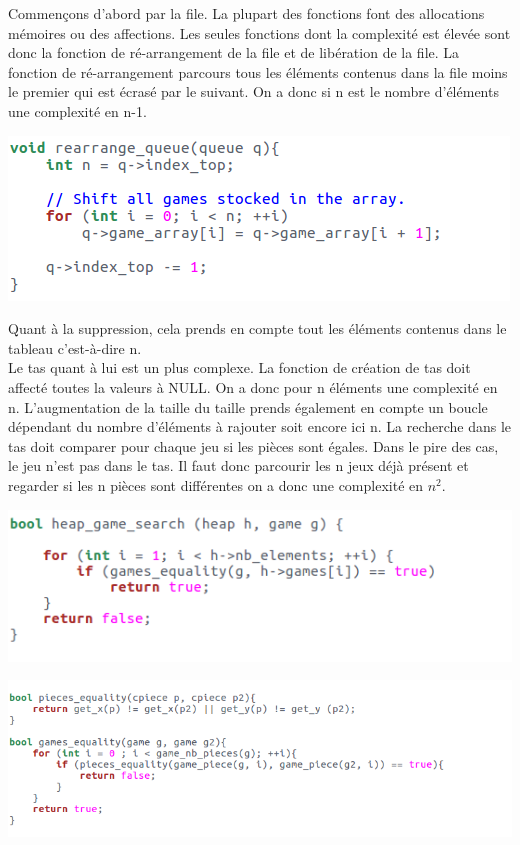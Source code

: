 \documentclass{article}
\begin{document}
Commençons d'abord par la file. La plupart des fonctions font des allocations mémoires ou des affections. Les seules fonctions dont la complexité est élevée sont donc la fonction de ré-arrangement de la file et de libération de la file. La fonction de ré-arrangement parcours tous les éléments contenus dans la file moins le premier qui est écrasé par le suivant. On a donc si n est le nombre d'éléments une complexité en n-1.


\begin{flushleft}
\includegraphics[scale=0.45]{triqueue.png}
\end{flushleft}

Quant à la suppression, cela prends en compte tout les éléments contenus dans le tableau c'est-à-dire n.\\

Le tas quant à lui est un plus complexe. La fonction de création de tas doit affecté toutes la valeurs à NULL. On a donc pour n éléments une complexité en n. L'augmentation de la taille du taille prends également en compte un boucle dépendant du nombre d'éléments à rajouter soit encore ici n. 
La recherche dans le tas doit comparer pour chaque jeu si les pièces sont égales. Dans le pire des cas, le jeu n'est pas dans le tas. Il faut donc parcourir les n jeux déjà présent et regarder si les n pièces sont différentes on a donc une complexité en $n^{2}$.

\begin{flushleft}
\includegraphics[scale=0.45]{recherchetas.png}
\end{flushleft}

\begin{flushleft}
\includegraphics[scale=0.45]{egalitejeux.png}
\end{flushleft}
\end{document}
